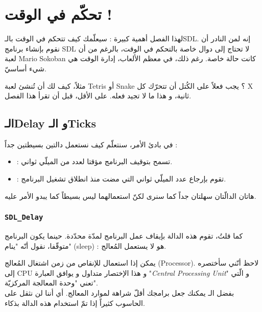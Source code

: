 \chapter{تحكّم في الوقت !}

لهذا الفصل أهمية كبيرة : سيعلّمك كيف تتحكم في الوقت بالـ\textenglish{SDL}.
 إنه لمن النادر أن نقوم بإنشاء برنامج
\textenglish{SDL}
لا تحتاج إلى دوال خاصة بالتحكم في الوقت، بالرغم من أن لعبة
\textenglish{Mario Sokoban}
كانت حالة خاصة. رغم ذلك، في معظم الألعاب، إدارة الوقت هي شيء أساسيّ.

مثلاً، كيف لك أن تُنشئ لعبة 
\textenglish{Tetris}
أو
\textenglish{Snake} ؟
يجب فعلاً على الكُتل أن تتحرّك كل
\textenglish{X}
ثانية، و هذا ما لا تجيد فعله. على الأقل، قبل أن تقرأ هذا الفصل.

\section{الـ\textenglish{Delay} و الـ\textenglish{Ticks}}

في بادئ الأمر، سنتعلّم كيف نستعمل دالتين بسيطتين جداً :

\begin{itemize}
	\item {} :
	تسمح بتوقيف البرنامج مؤقتا لعدد من الميلّي ثواني.
	\item {} :
	تقوم بإرجاع عدد الميلّي ثواني التي مضت منذ انطلاق تشغيل البرنامج.
\end{itemize}

هاتان الدالّتان سهلتان جداً كما سنرى لكنّ استعمالهما ليس بسيطاً كما يبدو الأمر عليه.

\subsection{\texttt{SDL\_Delay}}

كما قلتُ، تقوم هذه الدالة بإيقاف عمل البرنامج لمدّة محدّدة. حينما يكون البرنامج متوقّفا، نقول أنّه "ينام" 
(\textenglish{sleep}) :
 هو لا يستعمل المُعالج. 
 
 يمكن إذا استعمال 
للإنقاص من زمن اشتغال المُعالج 
(\textenglish{Processor}).
لاحظ أنّني سأختصره إلى 
\textenglish{CPU}
و هذا الإختصار متداول و يوافق العبارة 
"\textit{\textenglish{Central Processing Unit}}"
و الّتي تعني "وحدة المعالجة المركزيّة".\\
بفضل الـ
يمكنك جعل برامجك أقلّ شراهة لموارد المعالج. أي أننا لن نثقل على الحاسوب كثيراً إذا تمّ استخدام هذه الدالة بذكاء.


